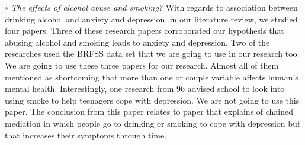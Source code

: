 \documentclass[letterpaper, 10 pt, conference]{ieeeconf}  %
\begin{document}
\par\noindent\textit{$\circ$ The effects of alcohol abuse and smoking?}\newline
With regards to association between drinking alcohol and anxiety and depression, in our 
literature review, we studied four papers. Three of these research papers
\cite{jia2018associations}\cite{strine2008depression}\cite{allan2015effects}
corroborated 
our hypothesis that abusing alcohol and smoking leads to anxiety and depression. Two of the 
researches used the BRFSS data set that we are going to use in our research too. We are going 
to use these three papers for our research. Almost all of them mentioned as shortcoming that 
more than one or couple variable affects human’s mental health. Interestingly, one research 
from 96 advised school to look into using smoke to help teenagers cope with depression. We are 
not going to use this paper. The conclusion from this paper relates to paper \cite{patton1996smoking} that explains 
of chained mediation in which people go to drinking or smoking to cope with depression but that 
increases their symptoms through time.

%
\captionsetup[figure]{labelformat=empty}
\clearpage 
\begin{figure}[hbt!]
        \centering
        
        \addvspace{250pt}
        
        \hspace{-10cm}
        
        \caption{}
        \label{fig:schedule}
\end{figure}

\clearpage 




\end{document}
